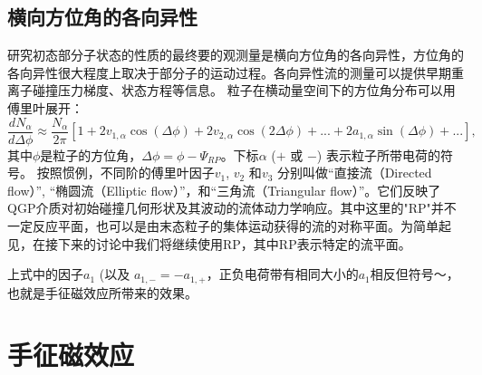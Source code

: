 \subsection{横向方位角的各向异性}

研究初态部分子状态的性质的最终要的观测量是横向方位角的各向异性，方位角的各向异性很大程度上取决于部分子的运动过程。各向异性流的测量可以提供早期重离子碰撞压力梯度、状态方程等信息。
粒子在横动量空间下的方位角分布可以用傅里叶展开：
\begin{equation}
    \frac{dN_{\alpha}}{d\Delta\phi} \approx \frac{N_\alpha}{2\pi} [1 + 2v_{1,\alpha}\cos(\Delta\phi) + 2v_{2,\alpha}\cos(2\Delta\phi) + ... + 2a_{1,\alpha}\sin(\Delta\phi) + ...],
\label{eq:Fourier_expansion}
\end{equation}
\noindent 其中$\phi$是粒子的方位角，$\Delta\phi = \phi - \Psi_{RP}$。下标$\alpha$ ($+$ 或 $-$) 表示粒子所带电荷的符号。 按照惯例，不同阶的傅里叶因子$v_1$, $v_2$ 和$v_3$ 分别叫做“直接流（Directed flow）”, “椭圆流（Elliptic flow）”，和“三角流（Triangular flow）”。它们反映了QGP介质对初始碰撞几何形状及其波动的流体动力学响应\cite{Poskanzer:1998yz}。其中这里的"RP"并不一定反应平面，也可以是由末态粒子的集体运动获得的流的对称平面。为简单起见，在接下来的讨论中我们将继续使用RP，其中RP表示特定的流平面。


上式中的因子$a_1$ (以及 $a_{1,-} = -a_{1,+}$，正负电荷带有相同大小的$a_1$相反但符号～\cite{Poskanzer:1998yz}，也就是手征磁效应所带来的效果。


\section{手征磁效应}



